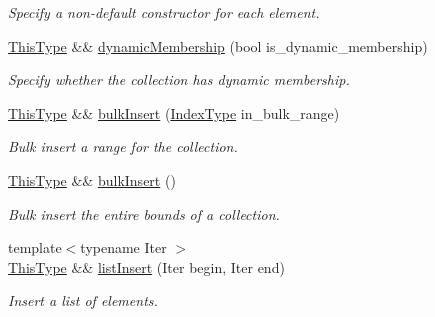 \begin{DoxyCompactItemize}
\begin{DoxyCompactList}\small\item\em Specify a non-\/default constructor for each element. \end{DoxyCompactList}\item 
\hyperlink{structvt_1_1vrt_1_1collection_1_1param_1_1_construct_params_a13d4910c0f6825c7b0ddfebce5288bea}{This\+Type} \&\& \hyperlink{structvt_1_1vrt_1_1collection_1_1param_1_1_construct_params_a2f27d980a653cfa641723f03e7b13e87}{dynamic\+Membership} (bool is\+\_\+dynamic\+\_\+membership)
\begin{DoxyCompactList}\small\item\em Specify whether the collection has dynamic membership. \end{DoxyCompactList}\item 
\hyperlink{structvt_1_1vrt_1_1collection_1_1param_1_1_construct_params_a13d4910c0f6825c7b0ddfebce5288bea}{This\+Type} \&\& \hyperlink{structvt_1_1vrt_1_1collection_1_1param_1_1_construct_params_af03cf3f305c56e36de87c537e8356f0a}{bulk\+Insert} (\hyperlink{structvt_1_1vrt_1_1collection_1_1param_1_1_construct_params_a7bc8d5d57e377e0f2e60031582eeb7e6}{Index\+Type} in\+\_\+bulk\+\_\+range)
\begin{DoxyCompactList}\small\item\em Bulk insert a range for the collection. \end{DoxyCompactList}\item 
\hyperlink{structvt_1_1vrt_1_1collection_1_1param_1_1_construct_params_a13d4910c0f6825c7b0ddfebce5288bea}{This\+Type} \&\& \hyperlink{structvt_1_1vrt_1_1collection_1_1param_1_1_construct_params_abf7e7faa810ea7d6c3a3abf0ad732a01}{bulk\+Insert} ()
\begin{DoxyCompactList}\small\item\em Bulk insert the entire bounds of a collection. \end{DoxyCompactList}\item 
{\footnotesize template$<$typename Iter $>$ }\\\hyperlink{structvt_1_1vrt_1_1collection_1_1param_1_1_construct_params_a13d4910c0f6825c7b0ddfebce5288bea}{This\+Type} \&\& \hyperlink{structvt_1_1vrt_1_1collection_1_1param_1_1_construct_params_a3338b667df3ff4cb3977d90e7cb09470}{list\+Insert} (Iter begin, Iter end)
\begin{DoxyCompactList}\small\item\em Insert a list of elements. \end{DoxyCompactList}\item 

\end{DoxyCompactItemize}
